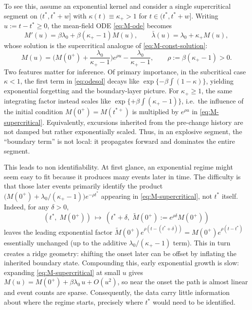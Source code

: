 \documentclass{article}
\theoremstyle{plain}
\theoremstyle{definition}
\newcommand{\1}{\mathbf{1}}
\begin{document}
    To see this, assume an exponential kernel and consider a single supercritical segment on \((t^\ast,t^\ast+w]\) with
    \(\kappa(t)\equiv\kappa_+>1\) for \(t\in(t^\ast,t^\ast+w]\).
    Writing \(u:=t-t^\ast\ge 0\), the mean-field ODE \eqref{eq:M-ode} becomes
    \[
    M'(u)=\beta\lambda_0+\beta(\kappa_+-1)M(u),\qquad \bar\lambda(u)=\lambda_0+\kappa_+ M(u),
    \]
    whose solution is the supercritical analogue of \eqref{eq:M-const-solution}:
    \begin{equation}
    \label{eq:M-supercritical}
    M(u)=\Big(M(0^+)+\frac{\lambda_0}{\kappa_+-1}\Big)e^{\rho u}-\frac{\lambda_0}{\kappa_+-1},
    \qquad \rho:=\beta(\kappa_+-1)>0.
    \end{equation}
    Two features matter for inference. Of primary importance, in the subcritical case \(\kappa<1\), the first term in \eqref{eq:odesol} decays like
    \(\exp\{-\beta\int(1-\kappa)\}\), yielding exponential forgetting and the boundary-layer picture. For \(\kappa_+\ge 1\), the same integrating factor instead scales like \(\exp\{+\beta\int(\kappa_+-1)\}\), i.e.\ the influence of the initial condition \(M(0^+)=M(t^{\ast+})\) is multiplied by \(e^{\rho u}\) in \eqref{eq:M-supercritical}. Equivalently, excursions inherited
    from the pre-change history are not damped but rather exponentially scaled. Thus, in an explosive segment, the ``boundary term'' is not local: it propagates forward and dominates the entire segment.
    
    This leads to non identifiability. At first glance, an exponential regime might seem easy to fit because it produces many events later in time. The difficulty is that those later events primarily identify the product
    \(\big(M(0^+)+\lambda_0/(\kappa_+-1)\big)e^{-\rho t^\ast}\) appearing in \eqref{eq:M-supercritical}, not \(t^\ast\)
    itself. Indeed, for any \(\delta>0\),
    \[
    (t^\ast,\;M(0^+))\ \mapsto\ (t^\ast+\delta,\; \tilde M(0^+):=e^{\rho\delta}M(0^+))
    \]
    leaves the leading exponential factor \(\tilde M(0^+)e^{\rho(t-(t^\ast+\delta))}=M(0^+)e^{\rho(t-t^\ast)}\) essentially unchanged (up to the additive \(\lambda_0/(\kappa_+-1)\) term). This in turn creates a ridge geometry: shifting the onset later can be offset by inflating the inherited boundary state. Compounding this, early exponential growth is slow: expanding \eqref{eq:M-supercritical} at small \(u\) gives \(M(u)=M(0^+)+\beta\lambda_0\,u+O(u^2)\), so near the onset the path is almost linear and event counts are sparse. Consequently, the data carry little information about where the regime starts, precisely where
    \(t^\ast\) would need to be identified.
    
\end{document}
